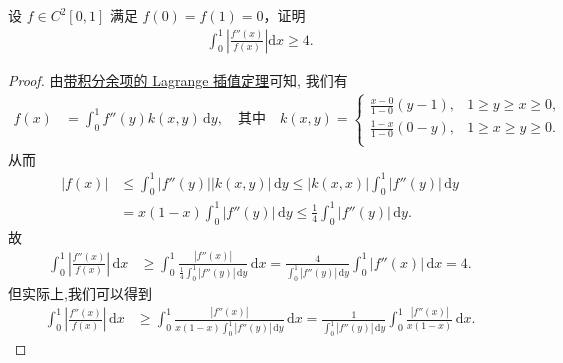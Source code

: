 \documentclass[../../main.tex]{subfiles}%
\begin{document}
\begin{example}
设 $f \in C^2[0,1]$ 满足 $f(0) = f(1) = 0$，证明
\begin{align*}
\int_{0}^{1} \left| \frac{f''(x)}{f(x)} \right| \mathrm{d}x \geqslant  4.
\end{align*}
\end{example}
\begin{proof}
由\hyperref[theorem:带积分型余项的Lagrange插值公式]{带积分余项的 Lagrange 插值定理}可知, 我们有
\begin{align*}
f(x) &= \int_0^1 f''(y) k(x,y) \, \mathrm{d}y, \quad \text{其中} \quad k(x,y) = 
\begin{cases}
\frac{x-0}{1-0}(y-1),&		1\geqslant y\geqslant x\geqslant 0,\\
\frac{1-x}{1-0}(0-y),&		1\geqslant x\geqslant y\geqslant 0.\\
\end{cases}
\end{align*}
从而
\begin{align*}
|f(x)| &\leqslant \int_0^1 |f''(y)| |k(x,y)| \, \mathrm{d}y \leqslant |k(x,x)| \int_0^1 |f''(y)| \, \mathrm{d}y \\
&= x(1-x) \int_0^1 |f''(y)| \, \mathrm{d}y \leqslant \frac{1}{4} \int_0^1 |f''(y)| \, \mathrm{d}y.
\end{align*}
故
\begin{align*}
\int_0^1 \left| \frac{f''(x)}{f(x)} \right| \, \mathrm{d}x &\geqslant \int_0^1 \frac{|f''(x)|}{\frac{1}{4} \int_0^1 |f''(y)| \, \mathrm{d}y} \, \mathrm{d}x = \frac{4}{\int_0^1 |f''(y)| \, \mathrm{d}y} \int_0^1 |f''(x)| \, \mathrm{d}x = 4.
\end{align*}
但实际上,我们可以得到
\begin{align*}
\int_0^1 \left| \frac{f''(x)}{f(x)} \right| \, \mathrm{d}x &\geqslant \int_0^1 \frac{|f''(x)|}{x(1-x) \int_0^1 |f''(y)| \, \mathrm{d}y} \, \mathrm{d}x = \frac{1}{\int_0^1 |f''(y)| \, \mathrm{d}y} \int_0^1 \frac{|f''(x)|}{x(1-x)} \, \mathrm{d}x.
\end{align*}
\end{proof}
\end{document}
